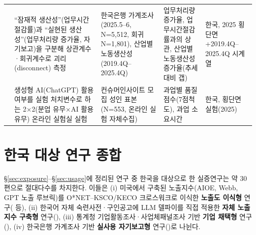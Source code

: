 \documentclass[11pt]{article}
\begin{document}
\begin{longtable}{L{2.3cm}L{4.1cm}L{3.6cm}L{2.6cm}L{2.3cm}}
\citet{bok-2026-ai-adoption-productivity-effects} &
``잠재적 생산성''(업무시간 절감률)과 ``실현된 생산성''(업무처리량 증가율, 자기보고)을 구분해 상관계수·회귀계수로 괴리(disconnect) 측정 &
한국은행 가계조사(2025.5--6, N=5,512, 회귀 N=1,801), 산업별 노동생산성(2019.4Q--2025.4Q) &
업무처리량 증가율, 업무시간절감률과의 상관, 산업별 노동생산성 증가율(추세대비 갭) &
한국, 2025 횡단면+2019.4Q--2025.4Q 시계열\\

\citet{min-2025-productivity-gains-generative-ai} &
생성형 AI(ChatGPT) 활용 여부를 실험 처치변수로 하는 2$\times$2(분업 유무$\times$AI 활용 유무) 온라인 실험실 실험 &
컨슈머인사이트 모집 성인 표본(N=553, 온라인 실험 자체수집) &
과업별 품질점수(7점척도), 과업 소요시간 &
한국, 횡단면 실험(2025)\\
\end{longtable}

\section{한국 대상 연구 종합}

\S\ref{sec:exposure}--\S\ref{sec:usage}에 정리된 연구 중 한국을 대상으로 한 실증연구는 약 30편으로 절대다수를 차지한다. 이들은 (i) 미국에서 구축된 노출지수(AIOE, Webb, GPT 노출 루브릭)를 O*NET--KSCO/KECO 크로스워크로 이식한 \textbf{노출도 이식형} 연구(\citealp{cheon-2022-ai-employment-wage-effects, han-2023-ai-and-labor-market-change, han-2025-ai-diffusion-youth-employment-decline, bok-2026-youth-employment-decline-ai-career-ladder, kiet-2025-ai-occupational-employment-effect, kim-2025-youth-job-choice-ai-exposure, noh-2025-ai-labor-coexistence} 등), (ii) 한국어 자체 숙련사전·구인공고에 LLM 델파이를 직접 적용한 \textbf{자체 노출지수 구축형} 연구(\citealp{chang-2025-ai-era-skills, chang-2026-ai-technology-diffusion-employment, keis-2025-ai-job-exposure-labor-demand, son-2025-llm-based-ai-job-exposure-measurement, noh-2025-ai-based-manufacturing-innovation-employment}), (iii) 통계청 기업활동조사·사업체패널조사 기반 \textbf{기업 채택형} 연구(\citealp{kiet-2021-ai-adoption-productivity, kiet-2024-ai-adoption-firms-policy, kim-2025-ai-adoption-firm-performance, lee-2025-ai-adoption-determinants-performance, nam-2026-ai-macroeconomic-impact-analysis}), (iv) 한국은행 가계조사 기반 \textbf{실사용 자기보고형} 연구(\citealp{bok-2025-rapid-ai-diffusion-productivity-effects, bok-2026-ai-adoption-productivity-effects})로 나뉜다.
\end{document}

